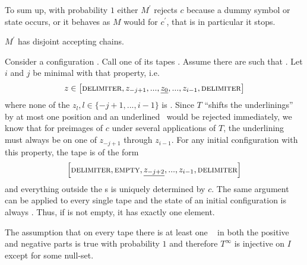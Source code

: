 	To sum up, with probability $1$ either $M^\prime$ rejects $c$ because a dummy symbol or state occurs, or it behaves as $M$ would for $c^\prime$, that is in particular it stops.
\endproof

\begin{Lemma}
	\label{tm_to_tds:properties:lemma_disjoint_accepting_chains}
	$M^\prime$ has disjoint accepting chains.
\end{Lemma}
\proof
	Consider a configuration . Call one of its tapes .
	Assume there are  such that .
	Let $i$ and $j$ be minimal with that property, i.e.
	\begin{align*}
		z \in \left [ \text{\scshape{delimiter}} , z_{-j+1} , ... , \underline{z_0} , ... , z_{i-1} , \text{\scshape{delimiter}} \right ]
	\end{align*}
	where none of the $z_l, l \in \{-j+1,...,i-1\}$ is \DELIM.
	Since $T$ ``shifts the underlinings'' by at most one position and an underlined \DELIM~would be rejected immediately, we know that for preimages of $c$ under several applications of $T$, the underlining must always be on one of $z_{-j+1}$ through $z_{i-1}$. For any initial configuration with this property, the tape is of the form
	\begin{align*}
		\left [ \text{\scshape{delimiter}} , \text{\scshape{empty}} , \underline{z_{-j+2}} , ... , z_{i-1} , \text{\scshape{delimiter}} \right ]
	\end{align*}
	and everything outside the \DELIM s is uniquely determined by $c$.
	The same argument can be applied to every single tape and the state of an initial configuration is always \INI.
	Thus, if  is not empty, it has exactly one element.

	The assumption that on every tape there is at least one \DELIM~ in both the positive and negative parts is true with probability $1$ and therefore $T^\infty$ is injective on $I$ except for some null-set.
\endproof
